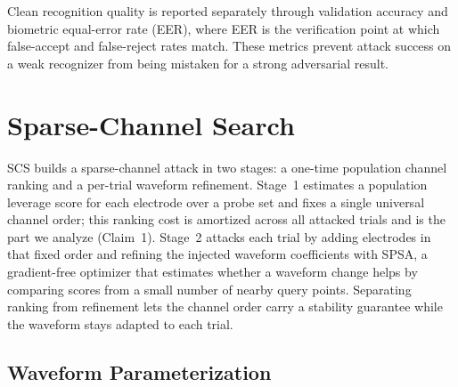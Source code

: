 \documentclass[journal]{IEEEtran}
\begin{document}
Clean recognition quality is reported separately through validation accuracy and biometric equal-error rate (EER), where EER is the verification point at which false-accept and false-reject rates match. These metrics prevent attack success on a weak recognizer from being mistaken for a strong adversarial result.

\section{Sparse-Channel Search}
\label{sec:scs}

SCS builds a sparse-channel attack in two stages: a one-time population channel ranking and a per-trial waveform refinement. Stage~1 estimates a population leverage score for each electrode over a probe set and fixes a single universal channel order; this ranking cost is amortized across all attacked trials and is the part we analyze (Claim~1). Stage~2 attacks each trial by adding electrodes in that fixed order and refining the injected waveform coefficients with SPSA, a gradient-free optimizer that estimates whether a waveform change helps by comparing scores from a small number of nearby query points. Separating ranking from refinement lets the channel order carry a stability guarantee while the waveform stays adapted to each trial.

\subsection{Waveform Parameterization}
\end{document}
